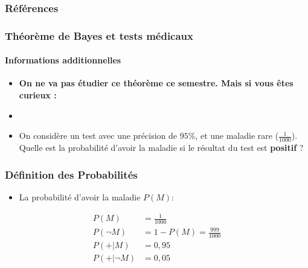 \documentclass[xcolor=dvipsnames, onlymath, 10pt, aspectratio=169, handout]{beamer}
\begin{document}
\appendix
\begin{frame}[allowframebreaks]

	{
		\footnotesize
		\frametitle{Références}
		

		
	}

\end{frame}





\appendix


\begin{frame}
	\frametitle{Théorème de Bayes et tests médicaux}
	\framesubtitle{Informations additionnelles}
	\label{bayes}

	\begin{itemize}
		\item \textbf{On ne va pas étudier ce théorème ce semestre. Mais si vous êtes curieux :}
		\item[]
		\item[]   On considère un test avec une précision de \(95\%\), et une maladie rare (\(\frac{1}{1000}\)).
		      Quelle est la probabilité d'avoir la maladie si le résultat du test est \textbf{positif} ?

	\end{itemize}


	\vfill
	\vfill


\end{frame}




\begin{frame}
	\frametitle{Définition des Probabilités}

	\begin{itemize}
		\item La probabilité d'avoir la maladie $P(M)$:
	\end{itemize}

	\begin{align*}
		P(M)        & = \frac{1}{1000}              \\
		P(\neg M)   & = 1 - P(M) = \frac{999}{1000} \\
		P(+|M)      & = 0,95                        \\
		P(+|\neg M) & = 0,05
	\end{align*}

	\vfill
	\vfill



\end{frame}
\end{document}
